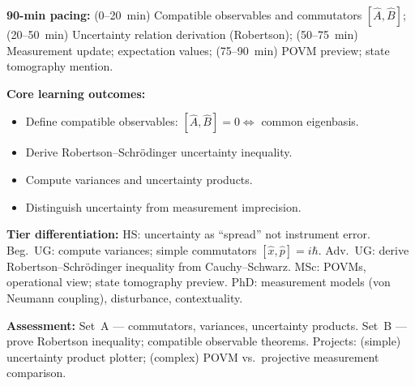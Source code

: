 \documentclass[11pt,a4paper]{article}
\begin{document}
\medskip
\begin{tcolorbox}[modulebox, title={Module~I.2 / L07: Measurement Theory: Postulates, Compatibility \& Uncertainty}]
\textbf{90-min pacing:} (0--20~min) Compatible observables and commutators $[\hat{A},\hat{B}]$;
(20--50~min) Uncertainty relation derivation (Robertson);
(50--75~min) Measurement update; expectation values;
(75--90~min) POVM preview; state tomography mention.

\medskip\textbf{Core learning outcomes:}
\begin{itemize}[leftmargin=1.4em,topsep=2pt,itemsep=1pt]
  \item Define compatible observables: $[\hat{A},\hat{B}]=0 \Leftrightarrow$ common eigenbasis.
  \item Derive Robertson--Schr\"odinger uncertainty inequality.
  \item Compute variances and uncertainty products.
  \item Distinguish uncertainty from measurement imprecision.
\end{itemize}

\medskip\textbf{Tier differentiation:}
HS: uncertainty as ``spread'' not instrument error.
Beg.\ UG: compute variances; simple commutators $[\hat{x},\hat{p}]=i\hbar$.
Adv.\ UG: derive Robertson--Schr\"odinger inequality from Cauchy--Schwarz.
MSc: POVMs, operational view; state tomography preview.
PhD: measurement models (von Neumann coupling), disturbance, contextuality.

\medskip\textbf{Assessment:}
Set~A --- commutators, variances, uncertainty products.
Set~B --- prove Robertson inequality; compatible observable theorems.
Projects: (simple) uncertainty product plotter; (complex) POVM vs.\ projective measurement comparison.
\end{tcolorbox}
\end{document}
